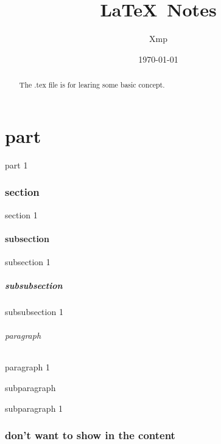 \documentclass[UTF8]{article}
\title{\LaTeX \ Notes}
\author{Xmp}
\date{\today}
\begin{document}
\maketitle

\setcounter{tocdepth}{2}%
\tableofcontents %
\listoffigures %
\listoftables %

\begin{abstract}%
	The .tex file is for learing some basic concept.
\end{abstract}

\part{part}%
part 1

\section{section}%
section 1

\subsection{subsection}%
subsection 1

\subsubsection{subsubsection}%
subsubsection 1

\paragraph{paragraph}%
paragraph 1

\subparagraph{subparagraph}%
subparagraph 1


\section*{don't want to show in the content}
\end{document}

